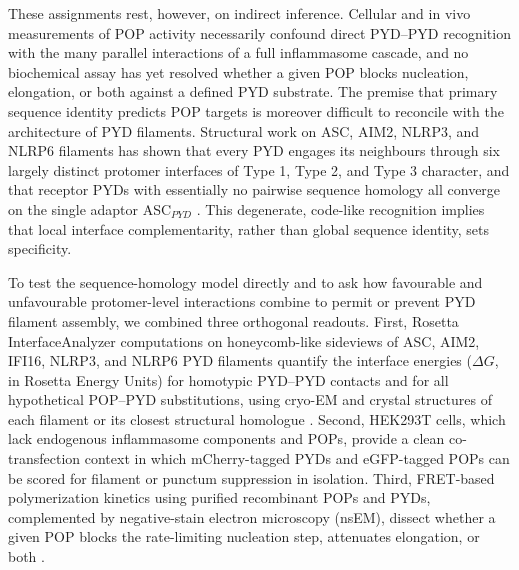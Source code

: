 \documentclass[11pt]{article}
\begin{document}
These assignments rest, however, on indirect inference. Cellular and in vivo
measurements of POP activity necessarily confound direct PYD--PYD recognition
with the many parallel interactions of a full inflammasome cascade, and no
biochemical assay has yet resolved whether a given POP blocks nucleation,
elongation, or both against a defined PYD substrate. The premise that primary
sequence identity predicts POP targets is moreover difficult to reconcile
with the architecture of PYD filaments. Structural work on ASC, AIM2,
NLRP3, and NLRP6 filaments has shown that every PYD engages its neighbours
through six largely distinct protomer interfaces of Type 1, Type 2, and
Type 3 character, and that receptor PYDs with essentially no pairwise
sequence homology all converge on the single adaptor ASC$_{PYD}$
\citep{lu2014unified, shen2019nlrp6, hochheiser2022directionality,
matyszewski2021distinct, morrone2015assembly, sharif2019nek7,
andreeva2021nlrp3}. This degenerate, code-like recognition implies that
local interface complementarity, rather than global sequence identity,
sets specificity.

To test the sequence-homology model directly and to ask how favourable and
unfavourable protomer-level interactions combine to permit or prevent PYD
filament assembly, we combined three orthogonal readouts. First, Rosetta
InterfaceAnalyzer computations on honeycomb-like sideviews of ASC, AIM2,
IFI16, NLRP3, and NLRP6 PYD filaments quantify the interface energies
($\Delta G$, in Rosetta Energy Units) for homotypic PYD--PYD contacts and
for all hypothetical POP--PYD substitutions, using cryo-EM and crystal
structures of each filament or its closest structural homologue
\citep{lu2014unified, shen2019nlrp6, hochheiser2022directionality,
sharif2019nek7, matyszewski2021distinct}. Second, HEK293T cells, which lack
endogenous inflammasome components and POPs, provide a clean co-transfection
context in which mCherry-tagged PYDs and eGFP-tagged POPs can be scored for
filament or punctum suppression in isolation. Third, FRET-based polymerization
kinetics using purified recombinant POPs and PYDs, complemented by
negative-stain electron microscopy (nsEM), dissect whether a given POP blocks
the rate-limiting nucleation step, attenuates elongation, or both
\citep{mazanek2019fret, matyszewski2018digital, morrone2015assembly}.
\end{document}

